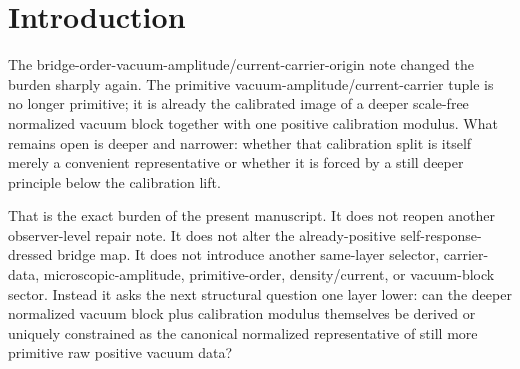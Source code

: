 \documentclass[11pt]{article}
\newcommand{\CurvScale}{\ell_{\mathrm{br}}}
\newcommand{\CurvProfileCan}{F_{\mathrm{br}}^{\mathrm{can}}}
\newcommand{\RespSusEq}{\Sigma_{\mathrm{br}}^{\ast}}
\newcommand{\RespOrderReadout}{\Xi_{\mathrm{br}}}
\newcommand{\RespOrderRef}{Z_{\mathrm{br}}^{\mathrm{ref}}}
\newcommand{\RespOrderStiff}{\Gamma_{\mathrm{br}}^{\mathrm{ord}}}
\newcommand{\RespOrderQuartic}{\Lambda_{\mathrm{br}}}
\newcommand{\RespOrderEq}{Z_{\mathrm{br}}^{\ast}}
\newcommand{\RespDeepReadout}{\mathfrak X_{\mathrm{br}}}
\newcommand{\RespDeepDensityRef}{\mathcal Z_{\mathrm{br}}^{\mathrm{ref}}}
\newcommand{\RespDeepTrack}{\mathfrak a_{\mathrm{br}}}
\newcommand{\RespDeepRelax}{\mathfrak b_{\mathrm{br}}}
\newcommand{\RespDeepWell}{\mathfrak l_{\mathrm{br}}}
\newcommand{\RespDeepDensityEq}{\mathcal Z_{\mathrm{br}}^{\ast}}
\newcommand{\RespVacAmp}{U_{\mathrm{br}}}
\newcommand{\RespVacPhase}{\phi_{\mathrm{br}}}
\newcommand{\RespVacCarrier}{V_{\mathrm{br}}}
\newcommand{\RespRawReadout}{\widehat q_{\mathrm{br}}}
\newcommand{\RespRawRef}{\widehat U_{\mathrm{br}}^{\mathrm{ref}}}
\newcommand{\RespRawCov}{\widehat\kappa_{\mathrm{br}}}
\newcommand{\RespRawRelax}{\widehat\rho_{\mathrm{br}}}
\newcommand{\RespRawWell}{\widehat\lambda_{\mathrm{br}}}
\newcommand{\RespRawEq}{\widehat U_{\mathrm{br}}^{\ast}}
\newcommand{\RespRawIso}{\widehat\eta_{\mathrm{br}}}
\begin{document}
\begin{abstract}
Identifying the raw tuple with the physical vacuum tuple immediately reproduces the same recovered density/current block,
\[
(\RespDeepReadout,\RespDeepDensityRef,\RespDeepTrack,\RespDeepRelax,\RespDeepWell,\RespDeepDensityEq)
=(\RespRawReadout,(\RespRawRef)^2,\RespRawCov,\RespRawRelax,\RespRawWell,(\RespRawEq)^2),
\]
the same composite primitive bridge-order block,
\[
(\RespOrderReadout,\RespOrderRef,\RespOrderStiff,\RespOrderQuartic,\RespOrderEq)
=(\RespRawReadout,\RespRawRef,\RespRawIso,\RespRawWell,\RespRawEq),
\]
the same phase-neutral minimizing branch
\[
\RespVacAmp(x)\equiv \RespRawEq,\qquad
\RespVacCarrier(x)\equiv0,\qquad
\RespVacPhase(x)\equiv\phi_0,
\]
the same response scale
\[
\CurvScale^4=\RespSusEq=\frac{\RespRawEq}{\RespRawRef},
\]
the same canonical profile
\[
\CurvProfileCan(x)=1+\frac{\RespRawEq}{\RespRawRef}x^2,
\]
and therefore the same downstream package and surviving dressed bridge map. The deeper positive scale orbit acts only on radial calibration weights. It supplies neither anisotropic locking nor an angle quotient, so the global \(O(2)\) vacuum angle remains honestly residual.
\end{abstract}

\section{Introduction}

The bridge-order-vacuum-amplitude/current-carrier-origin note changed the burden sharply again. The primitive vacuum-amplitude/current-carrier tuple is no longer primitive; it is already the calibrated image of a deeper scale-free normalized vacuum block together with one positive calibration modulus. What remains open is deeper and narrower: whether that calibration split is itself merely a convenient representative or whether it is forced by a still deeper principle below the calibration lift.

That is the exact burden of the present manuscript. It does not reopen another observer-level repair note. It does not alter the already-positive self-response-dressed bridge map. It does not introduce another same-layer selector, carrier-data, microscopic-amplitude, primitive-order, density/current, or vacuum-block sector. Instead it asks the next structural question one layer lower: can the deeper normalized vacuum block plus calibration modulus themselves be derived or uniquely constrained as the canonical normalized representative of still more primitive raw positive vacuum data?
\end{document}
